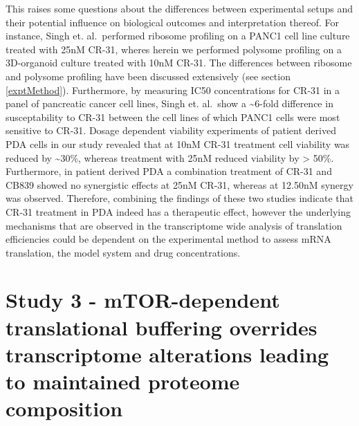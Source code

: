 \documentclass[
  12pt,
  openany]{book}
\begin{document}
This raises some questions about the differences between experimental setups and their potential influence on biological outcomes and interpretation thereof. For instance, Singh et. al.~performed ribosome profiling on a PANC1 cell line culture treated with 25nM CR-31, wheres herein we performed polysome profiling on a 3D-organoid culture treated with 10nM CR-31. The differences between ribosome and polysome profiling have been discussed extensively (see section \ref{exptMethod}). Furthermore, by measuring IC50 concentrations for CR-31 in a panel of pancreatic cancer cell lines, Singh et. al.~show a \textasciitilde6-fold difference in susceptability to CR-31 between the cell lines of which PANC1 cells were most sensitive to CR-31. Dosage dependent viability experiments of patient derived PDA cells in our study revealed that at 10nM CR-31 treatment cell viability was reduced by \textasciitilde30\%, whereas treatment with 25nM reduced viability by \textgreater{} 50\%. Furthermore, in patient derived PDA a combination treatment of CR-31 and CB839 showed no synergistic effects at 25nM CR-31, whereas at 12.50nM synergy was observed. Therefore, combining the findings of these two studies indicate that CR-31 treatment in PDA indeed has a therapeutic effect, however the underlying mechanisms that are observed in the transcriptome wide analysis of translation efficiencies could be dependent on the experimental method to assess mRNA translation, the model system and drug concentrations.
\newline

\section{Study 3 - mTOR-dependent translational buffering overrides transcriptome alterations leading to
maintained proteome composition}
\end{document}
